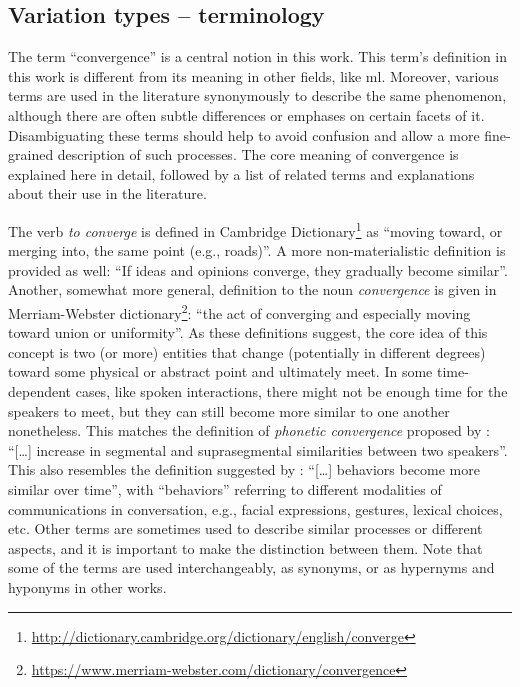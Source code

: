 \subsection{Variation types -- terminology}
\label{subsec:variation_types}

The term \enquote{convergence} is a central notion in this work.
This term's definition in this work is different from its meaning in other fields, like \ac{ml}.
Moreover, various terms are used in the literature synonymously to describe the same phenomenon, although there are often subtle differences or emphases on certain facets of it.
Disambiguating these terms should help to avoid confusion and allow a more fine-grained description of such processes.
The core meaning of convergence is explained here in detail, followed by a list of related terms and explanations about their use in the literature.

The verb \textit{to converge} is defined in Cambridge Dictionary\footnote{\url{http://dictionary.cambridge.org/dictionary/english/converge}} as \enquote{moving toward, or merging into, the same point (e.g., roads)}.
A more non-materialistic definition is provided as well: \enquote{If ideas and opinions converge, they gradually become similar}.
Another, somewhat more general, definition to the noun \textit{convergence} is given in Merriam-Webster dictionary\footnote{\url{https://www.merriam-webster.com/dictionary/convergence}}: \enquote{the act of converging and especially moving toward union or uniformity}.
As these definitions suggest, the core idea of this concept is two (or more) entities that change (potentially in different degrees) toward some physical or abstract point and ultimately meet.
In some time-dependent cases, like spoken interactions, there might not be enough time for the speakers to meet, but they can still become more similar to one another nonetheless.
This matches the definition of \emph{phonetic convergence} proposed by \citet{Pardo2006phonetic}: \enquote{[\ldots] increase in segmental and suprasegmental similarities between two speakers}.
This also resembles the definition suggested by \citet{Xia2014prosodic}: \enquote{[\ldots] behaviors become more similar over time}, with \enquote{behaviors} referring to different modalities of communications in conversation, e.g., facial expressions, gestures, lexical choices, etc.
Other terms are sometimes used to describe similar processes or different aspects, and it is important to make the distinction between them.
Note that some of the terms are used interchangeably, as synonyms, or as hypernyms and hyponyms in other works.

